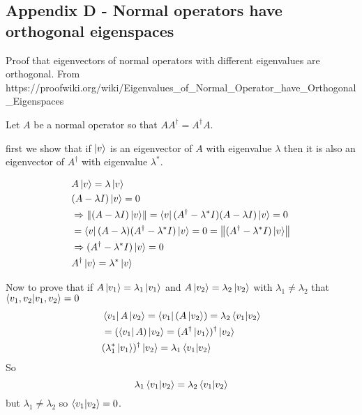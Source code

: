 \documentclass[12pt]{article}
\begin{document}
\subsection{Appendix D - Normal operators have orthogonal eigenspaces}
Proof that eigenvectors of normal operators with different eigenvalues are orthogonal. From https://proofwiki.org/wiki/Eigenvalues\_of\_Normal\_Operator\_have\_Orthogonal\_Eigenspaces

Let $A$ be a normal operator so that $AA^{\dag} = A^{\dag}A$.

first we show that if $\ket{v}$ is an eigenvector of $A$ with eigenvalue $\lambda$ then it is also an eigenvector of $A^{\dag}$ with eigenvalue $\lambda^*$.

\begin{align}
&A\ket{v} = \lambda \ket{v}\\
&(A-\lambda I)\ket{v} = 0\\
&\Rightarrow \norm{(A-\lambda I)\ket{v}} = \bra{v}(A^{\dag}-\lambda^*I)(A-\lambda I)\ket{v}=0\\
&=\bra{v}(A-\lambda)(A^{\dag}-\lambda^* I)\ket{v} =0 = \norm{(A^{\dag}-\lambda^* I)\ket{v}}\\
&\Rightarrow (A^{\dag}-\lambda^* I)\ket{v}=0\\
&A^{\dag} \ket{v} = \lambda^* \ket{v}
\end{align}

Now to prove that if $A\ket{v_1} = \lambda_1\ket{v_1}$ and $A\ket{v_2} = \lambda_2\ket{v_2}$ with $\lambda_1\neq\lambda_2$ that $\braket{v_1,v_2}=0$
\begin{align}
&\bra{v_1}A\ket{v_2} = \bra{v_1}(A\ket{v_2}) = \lambda_2 \bra{v_1}\ket{v_2}\\ 
&= (\bra{v_1} A) \ket{v_2} = (A^{\dag} \ket{v_1})^{\dag} \ket{v_2}\\
&(\lambda_1^* \ket{v_1})^{\dag} \ket{v_2} = \lambda_1 \bra{v_1}\ket{v_2}
\end{align}
So
\begin{equation}
\lambda_1 \bra{v_1}\ket{v_2} = \lambda_2 \bra{v_1}\ket{v_2}
\end{equation}
but $\lambda_1 \neq \lambda_2$ so $\bra{v_1}\ket{v_2}=0$.
\end{document}
